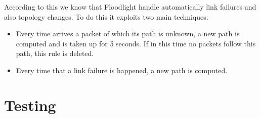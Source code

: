 \documentclass[a4paper]{report}
\begin{document}
	\noindent According to this we know that Floodlight handle automatically link failures and also topology changes. To do this it exploits two main techniques:
	
	\begin{itemize}
        \item Every time arrives a packet of which its path is unknown, a new path is computed and is taken up for 5 seconds. If in this time no packets follow this path, this rule is deleted.

	\item Every time that a link failure is happened, a new path is computed.
	\end{itemize}

	\chapter{Testing}
	
\end{document}
